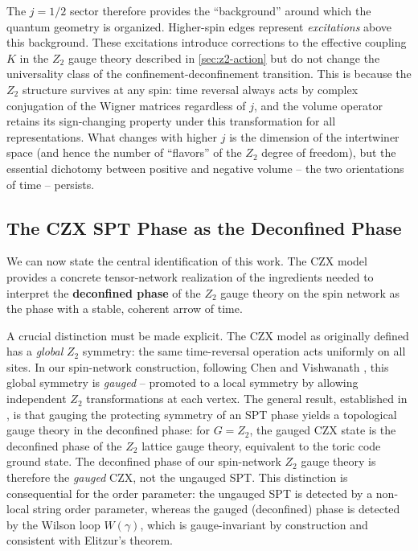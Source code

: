 \documentclass[preprint]{SciPost}
\theoremstyle{plain} %
\begin{document}
The $ j = 1/2 $ sector therefore provides the ``background'' around which the quantum geometry is organized. Higher-spin edges represent \emph{excitations} above this background. These excitations introduce corrections to the effective coupling $ K $ in the $ Z_2 $ gauge theory described in \autoref{sec:z2-action} but do not change the universality class of the confinement-deconfinement transition. This is because the $ Z_2 $ structure survives at any spin: time reversal always acts by complex conjugation of the Wigner matrices regardless of $ j $, and the volume operator retains its sign-changing property under this transformation for all representations. What changes with higher $ j $ is the dimension of the intertwiner space (and hence the number of ``flavors'' of the $ Z_2 $ degree of freedom), but the essential dichotomy between positive and negative volume -- the two orientations of time -- persists.

\subsection{The CZX SPT Phase as the Deconfined Phase}\label{subsec:spt-deconfined}

We can now state the central identification of this work. The CZX model provides a concrete tensor-network realization of the ingredients needed to interpret the \textbf{deconfined phase} of the $ Z_2 $ gauge theory on the spin network as the phase with a stable, coherent arrow of time.

A crucial distinction must be made explicit. The CZX model as originally defined \cite{Chen2011Symmetry,Chen2010Local} has a \emph{global} $ Z_2 $ symmetry: the same time-reversal operation acts uniformly on all sites. In our spin-network construction, following Chen and Vishwanath \cite{Chen2015Gauging}, this global symmetry is \emph{gauged} -- promoted to a local symmetry by allowing independent $ Z_2 $ transformations at each vertex. The general result, established in \cite{Levin2012Braiding,Haegeman2015Gauging}, is that gauging the protecting symmetry of an SPT phase yields a topological gauge theory in the deconfined phase: for $ G = Z_2 $, the gauged CZX state is the deconfined phase of the $ Z_2 $ lattice gauge theory, equivalent to the toric code ground state. The deconfined phase of our spin-network $ Z_2 $ gauge theory is therefore the \emph{gauged} CZX, not the ungauged SPT. This distinction is consequential for the order parameter: the ungauged SPT is detected by a non-local string order parameter, whereas the gauged (deconfined) phase is detected by the Wilson loop $ W(\gamma) $, which is gauge-invariant by construction and consistent with Elitzur's theorem.
\end{document}
